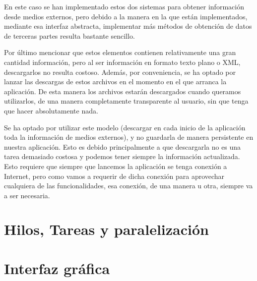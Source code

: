 En este caso se han implementado estos dos sistemas para obtener información desde medios externos, pero debido a la manera en la que están implementados, mediante esa interfaz abstracta, implementar más métodos de obtención de datos de terceras partes resulta bastante sencillo.

Por último mencionar que estos elementos contienen relativamente una gran cantidad información, pero al ser información en formato texto plano o XML, descargarlos no resulta costoso. Además, por conveniencia, se ha optado por lanzar las descargas de estos archivos en el momento en el que arranca la aplicación. De esta manera los archivos estarán descargados cuando queramos utilizarlos, de una manera completamente transparente al usuario, sin que tenga que hacer absolutamente nada.

Se ha optado por utilizar este modelo (descargar en cada inicio de la aplicación toda la información de medios externos), y no guardarla de manera persistente en nuestra aplicación. Esto es debido principalmente a que descargarla no es una tarea demasiado costosa y podemos tener siempre la información actualizada. Esto requiere que siempre que lancemos la aplicación se tenga conexión a Internet, pero como vamos a requerir de dicha conexión para aprovechar cualquiera de las funcionalidades, esa conexión, de una manera u otra, siempre va a ser necesaria.


\section{Hilos, Tareas y paralelización}

\section{Interfaz gráfica}



